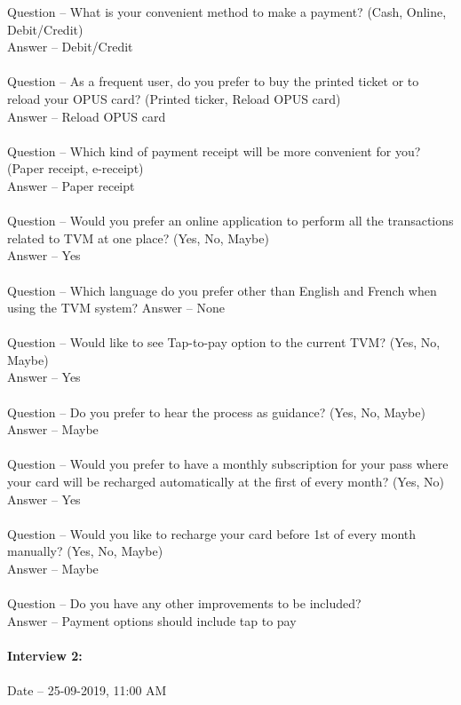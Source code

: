 \documentclass[a4paper, 11pt]{report}
\begin{document}
{Question – What is your convenient method to make a payment? (Cash, Online, Debit/Credit)\\
Answer – Debit/Credit\\\\
Question – As a frequent user, do you prefer to buy the printed ticket or to reload your OPUS card? (Printed ticker, Reload OPUS card)\\
Answer – Reload OPUS card\\\\
Question – Which kind of payment receipt will be more convenient for you? (Paper receipt, e-receipt)\\
Answer – Paper receipt\\\\
Question – Would you prefer an online application to perform all the transactions related to TVM at one place? (Yes, No, Maybe)\\
Answer – Yes\\\\
Question – Which language do you prefer other than English and French when using the TVM system?
Answer – None\\\\
Question – Would like to see Tap-to-pay option to the current TVM? (Yes, No, Maybe)\\
Answer – Yes\\\\
Question – Do you prefer to hear the process as guidance? (Yes, No, Maybe)\\
Answer – Maybe\\\\
Question – Would you prefer to have a monthly subscription for your pass where your card will be recharged automatically at the first of every month? (Yes, No)\\
Answer – Yes\\\\
Question – Would you like to recharge your card before 1st of every month manually? (Yes, No, Maybe)\\
Answer – Maybe\\\\
Question – Do you have any other improvements to be included?\\
Answer – Payment options should include tap to pay\\\\
\textbf{Interview 2:}\\\\
Date – 25-09-2019, 11:00 AM \\
}
\end{document}
